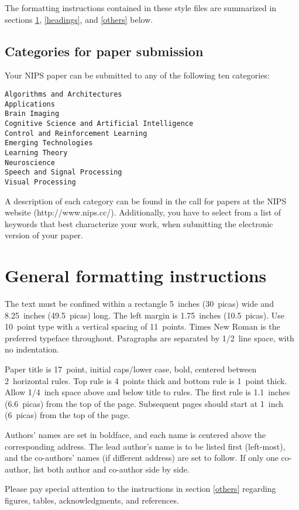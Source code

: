 \documentclass{article}
\begin{document}
The formatting instructions contained in these style files are summarized in
sections \ref{gen_inst}, \ref{headings}, and \ref{others} below.

\subsection{Categories for paper submission}
Your NIPS paper can be submitted to any of the following ten categories:

\begin{verbatim}
Algorithms and Architectures
Applications
Brain Imaging
Cognitive Science and Artificial Intelligence
Control and Reinforcement Learning
Emerging Technologies
Learning Theory
Neuroscience
Speech and Signal Processing
Visual Processing
\end{verbatim}

A description of each category can be found in the call for papers at
the NIPS website (http://www.nips.cc/). Additionally, you have to
select from a list of keywords that best characterize your work, when
submitting the electronic version of your paper.

\section{General formatting instructions}
\label{gen_inst}

The text must be confined within a rectangle 5~inches (30~picas) wide and
8.25~inches (49.5~picas) long. The left margin is 1.75~inches (10.5~picas).
Use 10~point type with a vertical spacing of 11~points. Times New Roman is the
preferred typeface throughout. Paragraphs are separated by 1/2~line space,
with no indentation.

Paper title is 17~point, initial caps/lower case, bold, centered between
2~horizontal rules. Top rule is 4~points thick and bottom rule is 1~point
thick. Allow 1/4~inch space above and below title to rules. The first rule is
1.1~inches (6.6~picas) from the top of the page. Subsequent pages should start
at 1~inch (6~picas) from the top of the page.

Authors' names are set in boldface, and each name is centered above the
corresponding address. The lead author's name is to be listed first
(left-most), and the co-authors' names (if different address) are set to
follow. If only one co-author, list both author and co-author side by side.

Please pay special attention to the instructions in section \ref{others}
regarding figures, tables, acknowledgments, and references.
\end{document}
